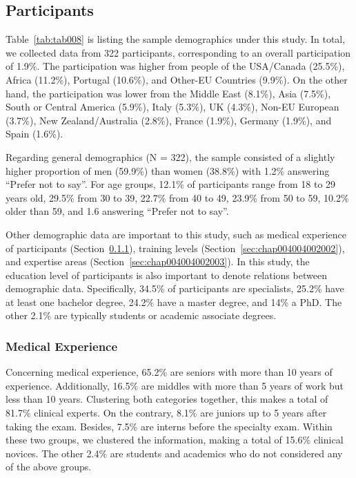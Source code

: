 \subsection{Participants}
\label{sec:chap004004002}

Table~\ref{tab:tab008} is listing the sample demographics under this study.
In total, we collected data from 322 participants, corresponding to an overall participation of 1.9\%.
The participation was higher from people of the USA/Canada (25.5\%), Africa (11.2\%), Portugal (10.6\%), and Other-EU Countries (9.9\%).
On the other hand, the participation was lower from the Middle East (8.1\%), Asia (7.5\%), South or Central America (5.9\%), Italy (5.3\%), UK (4.3\%), Non-EU European (3.7\%), New Zealand/Australia (2.8\%), France (1.9\%), Germany (1.9\%), and Spain (1.6\%).

Regarding general demographics (N = 322), the sample consisted of a slightly higher proportion of men (59.9\%) than women (38.8\%) with 1.2\% answering ``Prefer not to say''.
For age groups, 12.1\% of participants range from 18 to 29 years old, 29.5\% from 30 to 39, 22.7\% from 40 to 49, 23.9\% from 50 to 59, 10.2\% older than 59, and 1.6 answering ``Prefer not to say''.



Other demographic data are important to this study, such as medical experience of participants (Section~\ref{sec:chap004004002001}), training levels (Section~\ref{sec:chap004004002002}), and expertise areas (Section~\ref{sec:chap004004002003}).
In this study, the education level of participants is also important to denote relations between demographic data.
Specifically, 34.5\% of participants are specialists, 25.2\% have at least one bachelor degree, 24.2\% have a master degree, and 14\% a PhD.
The other 2.1\% are typically students or academic associate degrees.

\subsubsection{Medical Experience}
\label{sec:chap004004002001}

Concerning medical experience, 65.2\% are seniors with more than 10 years of experience.
Additionally, 16.5\% are middles with more than 5 years of work but less than 10 years.
Clustering both categories together, this makes a total of 81.7\% clinical experts.
On the contrary, 8.1\% are juniors up to 5 years after taking the exam.
Besides, 7.5\% are interns before the specialty exam.
Within these two groups, we clustered the information, making a total of 15.6\% clinical novices.
The other 2.4\% are students and academics who do not considered any of the above groups.

